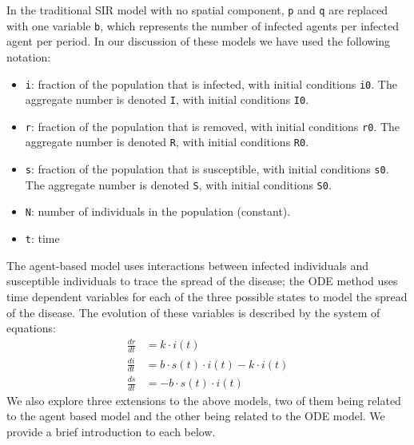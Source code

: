 \documentclass[twoside]{extarticle}                                    %
\numberwithin{equation}{section}                                       %
\begin{document}
In the traditional SIR model with no spatial component, \texttt{p} and \texttt{q} are replaced with one variable \texttt{b}, which represents the number of infected agents per infected agent per period. In our discussion of these models we have used the following notation:
\begin{itemize}[itemsep = 0em]
    \item \texttt{i}: fraction of the population that is infected, with initial conditions \texttt{i0}. The aggregate number is denoted \texttt{I}, with initial conditions \texttt{I0}.
    \item \texttt{r}: fraction of the population that is removed, with initial conditions \texttt{r0}. The aggregate number is denoted \texttt{R}, with initial conditions \texttt{R0}.
    \item \texttt{s}: fraction of the population that is susceptible, with initial conditions \texttt{s0}. The aggregate number is denoted \texttt{S}, with initial conditions \texttt{S0}.
    \item \texttt{N}: number of individuals in the population (constant).
    \item \texttt{t}: time
\end{itemize}
The agent-based model uses interactions between infected individuals and susceptible individuals to trace the spread of the disease; the ODE method uses time dependent variables for each of the three possible states to model the spread of the disease. The evolution of these variables is described by the system of equations:
\begin{align}
    \frac{dr}{dt} &= k \cdot i(t) \\
    \frac{di}{dt} &= b \cdot s(t) \cdot i(t) - k \cdot i(t) \\
    \frac{ds}{dt} &= -b \cdot s(t) \cdot i(t)
\end{align}
We also explore three extensions to the above models, two of them being related to the agent based model and the other being related to the ODE model. We provide a brief introduction to each below.
\end{document}
